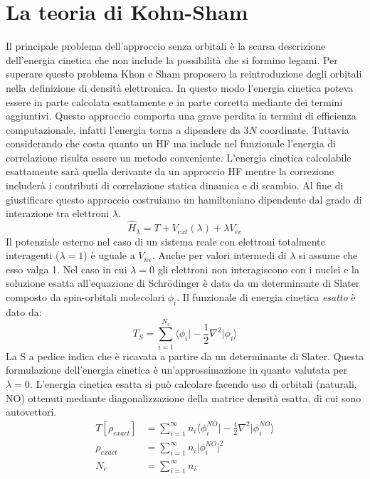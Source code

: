 \documentclass[oneside]{amsbook}
\numberwithin{section}{chapter}
\numberwithin{equation}{section}
\numberwithin{figure}{section}
\begin{document}
\section{La teoria di Kohn-Sham}
Il principale problema dell'approccio senza orbitali è la scarsa descrizione dell'energia cinetica che non include la possibilità che si formino legami. Per superare questo problema Khon e Sham proposero la reintroduzione degli orbitali nella definizione di densità elettronica. In questo modo l'energia cinetica poteva essere in parte calcolata esattamente e in parte corretta mediante dei termini aggiuntivi.
Questo approccio comporta una grave perdita in termini di efficienza computazionale, infatti l'energia torna a dipendere da $3N$ coordinate. Tuttavia considerando che costa quanto un HF ma include nel funzionale l'energia di correlazione risulta essere un metodo conveniente.
L'energia cinetica calcolabile esattamente sarà quella derivante da un approccio HF mentre la correzione includerà i contributi di correlazione statica dinamica e di scambio. Al fine di giustificare questo approccio costruiamo un  hamiltoniano dipendente dal grado di interazione tra elettroni $\lambda$.
\begin{equation}
\hat{H}_\lambda  = T +V_{ext}(\lambda)+\lambda V_{ee} 
\end{equation}
Il potenziale esterno nel caso di un sistema reale con elettroni totalmente interagenti ($\lambda=1$) è uguale a $V_{ne}$. Anche per valori intermedi di $\lambda$ si assume che esso valga 1. Nel caso in cui $\lambda=0$ gli elettroni non interagiscono con i nuclei e la soluzione esatta all'equazione di Schr\"odinger è data da un determinante di Slater composto da spin-orbitali molecolari $\phi_i$. Il funzionale di energia cinetica \emph{esatto } è dato da:
\begin{equation}
T_S= \sum \limits_{i=1} ^{N_e} \langle \phi_i \vert -\frac{1}{2} \nabla ^2 \vert \phi_i \rangle
\end{equation}
La S a pedice indica che è ricavata a partire da un determinante di Slater. Questa formulazione dell'energia cinetica è un'approssimazione in quanto valutata per $\lambda=0$. L'energia cinetica esatta si può calcolare facendo uso di orbitali (naturali, NO) ottenuti mediante diagonalizzazione della matrice densità esatta, di cui sono autovettori.
\begin{equation}
\begin{aligned}
T[\rho_{exact}]&= \sum \limits _{i=1}^\infty n_i \langle \phi_i^{NO} \vert  -\frac{1}{2} \nabla ^2 \vert \phi_i ^{NO}\rangle \\
\rho_{exact}&= \sum \limits _{i=1}^\infty n_i \vert \phi_i ^{NO}\vert ^2 \\
N_e&= \sum \limits _{i=1}^\infty n_i\\
\end{aligned}
\end{equation}
\end{document}
